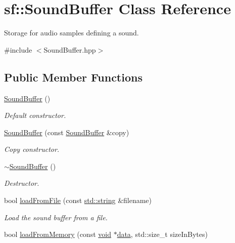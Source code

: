 \hypertarget{classsf_1_1_sound_buffer}{\section{sf\-:\-:Sound\-Buffer Class Reference}
\label{classsf_1_1_sound_buffer}
}


Storage for audio samples defining a sound.  




{\ttfamily \#include $<$Sound\-Buffer.\-hpp$>$}

\subsection*{Public Member Functions}
\begin{DoxyCompactItemize}
\item 
\hyperlink{classsf_1_1_sound_buffer_a0cabfbfe19b831bf7d5c9592d92ef233}{Sound\-Buffer} ()
\begin{DoxyCompactList}\small\item\em Default constructor. \end{DoxyCompactList}\item 
\hyperlink{classsf_1_1_sound_buffer_aaf000fc741ff27015907e8588263f4a6}{Sound\-Buffer} (const \hyperlink{classsf_1_1_sound_buffer}{Sound\-Buffer} \&copy)
\begin{DoxyCompactList}\small\item\em Copy constructor. \end{DoxyCompactList}\item 
\hyperlink{classsf_1_1_sound_buffer_aea240161724ffba74a0d6a9e277d3cd5}{$\sim$\-Sound\-Buffer} ()
\begin{DoxyCompactList}\small\item\em Destructor. \end{DoxyCompactList}\item 
bool \hyperlink{classsf_1_1_sound_buffer_a2be6a8025c97eb622a7dff6cf2594394}{load\-From\-File} (const \hyperlink{gl3_8h_ac83513893df92266f79a515488701770}{std\-::string} \&filename)
\begin{DoxyCompactList}\small\item\em Load the sound buffer from a file. \end{DoxyCompactList}\item 
bool \hyperlink{classsf_1_1_sound_buffer_af8cfa5599739a7edae69c5cba273d33f}{load\-From\-Memory} (const \hyperlink{glutf90_8h_ac778d6f63f1aaf8ebda0ce6ac821b56e}{void} $\ast$\hyperlink{gl3_8h_a0f78eecb0891cce3bdfc815b971866a1}{data}, std\-::size\-\_\-t size\-In\-Bytes)

\end{DoxyCompactItemize}
